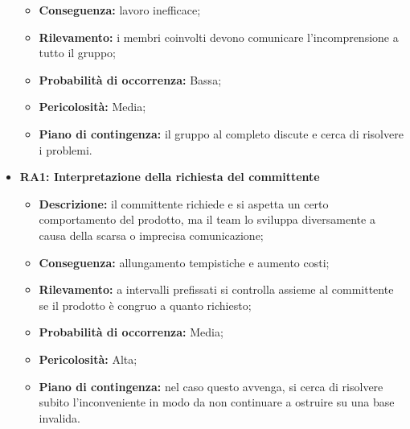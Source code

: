 \begin{itemize}
\begin{itemize}
		\item \textbf{Conseguenza:} lavoro inefficace;
		\item \textbf{Rilevamento:} i membri coinvolti devono comunicare l'incomprensione a tutto il gruppo;
		\item \textbf{Probabilità di occorrenza:} Bassa;
		\item \textbf{Pericolosità:} Media;
		\item \textbf{Piano di contingenza:} il gruppo al completo discute e cerca di risolvere i problemi.
	\end{itemize}
	\item \textbf{RA1: Interpretazione della richiesta del committente}
	\begin{itemize}
		\item \textbf{Descrizione:} il committente richiede e si aspetta un certo comportamento del prodotto, ma il team lo sviluppa diversamente a causa della scarsa o imprecisa comunicazione;
		\item \textbf{Conseguenza:} allungamento tempistiche e aumento costi; %
		\item \textbf{Rilevamento:} a intervalli prefissati si controlla assieme al committente se il prodotto è congruo a quanto richiesto;
		\item \textbf{Probabilità di occorrenza:} Media;
		\item \textbf{Pericolosità:} Alta;
		\item \textbf{Piano di contingenza:} nel caso questo avvenga, si cerca di risolvere subito l'inconveniente in modo da non continuare a ostruire su una base invalida.
	\end{itemize}
\end{itemize}